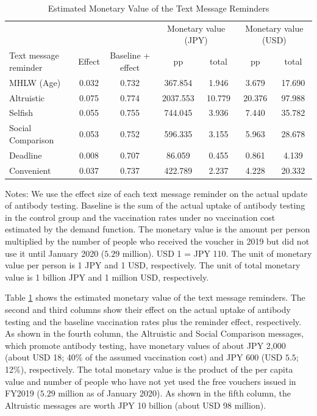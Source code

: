 \documentclass[
      12pt,
    a4paper
]{article}
\begin{document}
\begin{table}

\caption{\label{tab:monetary-value}Estimated Monetary Value of the Text Message Reminders}
\centering
\fontsize{9}{11}\selectfont
\begin{threeparttable}
\begin{tabular}[t]{lcccccc}
\toprule
\multicolumn{3}{c}{ } & \multicolumn{2}{c}{Monetary value (JPY)} & \multicolumn{2}{c}{Monetary value (USD)} \\
\cmidrule(l{3pt}r{3pt}){4-5} \cmidrule(l{3pt}r{3pt}){6-7}
Text message reminder & Effect & Baseline + effect & pp & total & pp & total\\
\midrule
MHLW (Age) & 0.032 & 0.732 & 367.854 & 1.946 & 3.679 & 17.690\\
Altruistic & 0.075 & 0.774 & 2037.553 & 10.779 & 20.376 & 97.988\\
Selfish & 0.055 & 0.755 & 744.045 & 3.936 & 7.440 & 35.782\\
Social Comparison & 0.053 & 0.752 & 596.335 & 3.155 & 5.963 & 28.678\\
Deadline & 0.008 & 0.707 & 86.059 & 0.455 & 0.861 & 4.139\\
Convenient & 0.037 & 0.737 & 422.789 & 2.237 & 4.228 & 20.332\\
\bottomrule
\end{tabular}
\begin{tablenotes}
\item Notes: We use the effect size of each text message reminder on the actual update of antibody testing. Baseline is the sum of the actual uptake of antibody testing in the control group and the vaccination rates under no vaccination cost estimated by the demand function. The monetary value is the amount per person multiplied by the number of people who received the voucher in 2019 but did not use it until January 2020 ($5.29$ million). USD 1 = JPY 110. The unit of monetary value per person is 1 JPY and 1 USD, respectively. The unit of total monetary value is 1 billion JPY and 1 million USD, respectively.
\end{tablenotes}
\end{threeparttable}
\end{table}

Table \ref{tab:monetary-value} shows the estimated monetary value of the text message reminders. The second and third columns show their effect on the actual uptake of antibody testing and the baseline vaccination rates plus the reminder effect, respectively. As shown in the fourth column, the Altruistic and Social Comparison messages, which promote antibody testing, have monetary values of about JPY 2,000 (about USD 18; 40\% of the assumed vaccination cost) and JPY 600 (USD \(5.5\); 12\%), respectively. The total monetary value is the product of the per capita value and number of people who have not yet used the free vouchers issued in FY2019 (\(5.29\) million as of January 2020). As shown in the fifth column, the Altruistic messages are worth JPY 10 billion (about USD 98 million).
\end{document}
